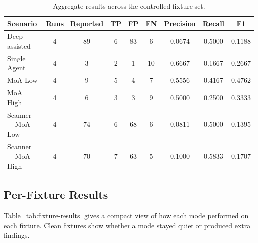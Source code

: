 \documentclass[sigconf,nonacm]{acmart}
\begin{document}
\begin{table}
  \caption{Aggregate results across the controlled fixture set.}
  \label{tab:mode-summary}
  \centering
  \small
  \begin{tabular}{lcccccccc}
    \toprule
    Scenario & Runs & Reported & TP & FP & FN & Precision & Recall & F1 \\
    \midrule
    Deep assisted & 4 & 89 & 6 & 83 & 6 & 0.0674 & 0.5000 & 0.1188 \\
    Single Agent & 4 & 3 & 2 & 1 & 10 & 0.6667 & 0.1667 & 0.2667 \\
    MoA Low & 4 & 9 & 5 & 4 & 7 & 0.5556 & 0.4167 & 0.4762 \\
    MoA High & 4 & 6 & 3 & 3 & 9 & 0.5000 & 0.2500 & 0.3333 \\
    Scanner + MoA Low & 4 & 74 & 6 & 68 & 6 & 0.0811 & 0.5000 & 0.1395 \\
    Scanner + MoA High & 4 & 70 & 7 & 63 & 5 & 0.1000 & 0.5833 & 0.1707 \\
    \bottomrule
  \end{tabular}
\end{table}

\subsection{Per-Fixture Results}
Table~\ref{tab:fixture-results} gives a compact view of how each mode performed on each fixture. Clean fixtures show whether a mode stayed quiet or produced extra findings.
\end{document}
